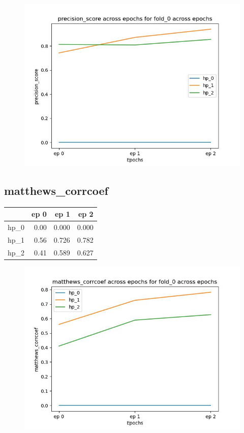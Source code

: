 \documentclass{article}
\begin{document}
\begin{figure}[H]
\includegraphics[scale = 0.75]{fold_0/precision_score}
\end{figure}
\subsection{matthews\_corrcoef}
\begin{tabular}{lrrr}
\toprule
{} &  ep 0 &   ep 1 &   ep 2 \\
\midrule
hp\_0 &  0.00 &  0.000 &  0.000 \\
hp\_1 &  0.56 &  0.726 &  0.782 \\
hp\_2 &  0.41 &  0.589 &  0.627 \\
\bottomrule
\end{tabular}

\begin{figure}[H]
\includegraphics[scale = 0.75]{fold_0/matthews_corrcoef}
\end{figure}
\end{document}
